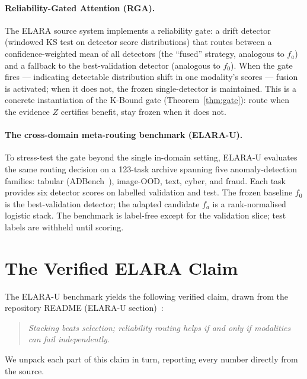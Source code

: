 \paragraph{Reliability-Gated Attention (RGA).}
The ELARA source system implements a reliability gate: a drift detector
(windowed KS test on detector score distributions) that routes between a
confidence-weighted mean of all detectors (the ``fused'' strategy, analogous to
$f_a$) and a fallback to the best-validation detector (analogous to $f_0$).  When
the gate fires --- indicating detectable distribution shift in one modality's
scores --- fusion is activated; when it does not, the frozen single-detector is
maintained.  This is a concrete instantiation of the K-Bound gate
(Theorem~\ref{thm:gate}): route when the evidence $Z$ certifies benefit, stay
frozen when it does not.

\paragraph{The cross-domain meta-routing benchmark (ELARA-U).}
To stress-test the gate beyond the single in-domain setting, ELARA-U evaluates the
same routing decision on a 123-task archive spanning five anomaly-detection families:
tabular (ADBench~\cite{han2022adbench}), image-OOD, text, cyber, and fraud.  Each
task provides six detector scores on labelled validation and test.  The frozen
baseline $f_0$ is the best-validation detector; the adapted candidate $f_a$ is a
rank-normalised logistic stack.  The benchmark is label-free except for the
validation slice; test labels are withheld until scoring.

\section{The Verified ELARA Claim}\label{sec:elara-claim}

The ELARA-U benchmark yields the following verified claim, drawn from the
repository README (ELARA-U section)~\cite{kbound2026repo}:

\begin{quote}
\textit{Stacking beats selection; reliability routing helps if and only if
modalities can fail independently.}
\end{quote}

We unpack each part of this claim in turn, reporting every number directly from
the source.

